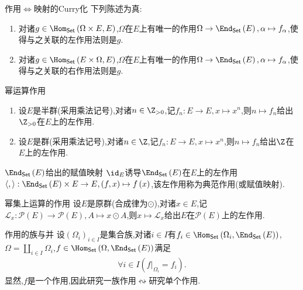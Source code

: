 \begin{theorem}{作用$\iff$映射的Curry化}{}
	下列陈述为真:
	\begin{enumerate}
		\item 对诸$g\in\Hom_{\mathsf{Set}}\left(\Omega\times E,E\right)$,$\Omega$在$E$上有唯一的作用$\Omega\to\End_{\mathsf{Set}}\left(E\right),\alpha\mapsto f_{\alpha}$,使得与之关联的左作用法则是$g$.
		\item 对诸$g\in\Hom_{\mathsf{Set}}\left(E\times\Omega,E\right)$,$\Omega$在$E$上有唯一的作用$\Omega\to\End_{\mathsf{Set}}\left(E\right),\alpha\mapsto f_{\alpha}$,使得与之关联的右作用法则是$g$.
	\end{enumerate}
\end{theorem}

\begin{example}{幂运算作用}{}
	\begin{enumerate}
		\item 设$E$是半群(采用乘法记号),对诸$n\in\Z_{>0}$,记$f_{n}:E\to E,x\mapsto x^{n}$,则$n\mapsto f_{n}$给出$\Z_{>0}$在$E$上的左作用.
		\item 设$E$是群(采用乘法记号),对诸$n\in\Z$,记$f_{n}:E\to E,x\mapsto x^{n}$,则$n\mapsto f_{n}$给出$\Z$在$E$上的左作用.
	\end{enumerate}
\end{example}

\begin{example}{$\End_{\mathsf{Set}}\left(E\right)$给出的赋值映射}{}
	$\id_{E}$诱导$\End_{\mathsf{Set}}\left(E\right)$在$E$上的左作用$\langle,\rangle:\End_{\mathsf{Set}}\left(E\right)\times E\to E,\left(f,x\right)\mapsto f\left(x\right)$,该左作用称为典范作用(或赋值映射).
\end{example}

\begin{example}{幂集上运算的作用}{}
	设$E$是原群(合成律为$\odot$),对诸$x\in E$,记$\mathcal{L}_{x}:\mathcal{P}\left(E\right)\to\mathcal{P}\left(E\right),A\mapsto x\odot A$,则$x\mapsto\mathcal{L}_{x}$给出$E$在$\mathcal{P}\left(E\right)$上的左作用.
\end{example}

\begin{example}{作用的族与并}{}
	设$\left(\Omega_{i}\right)_{i\in I}$是集合族,对诸$i\in I$有$f_{i}\in\Hom_{\mathsf{Set}}\left(\Omega_{i},\End_{\mathsf{Set}}\left(E\right)\right)$,$\Omega=\coprod\limits_{i\in I}\Omega_{i}$,$f\in\Hom_{\mathsf{Set}}\left(\Omega,\End_{\mathsf{Set}}\left(E\right)\right)$满足
	\begin{align*}
		\forall i\in I\left(f|_{\Omega_{i}}=f_{i}\right).
	\end{align*}
	显然,$f$是一个作用,因此研究一族作用$\leftrightsquigarrow$研究单个作用.
\end{example}

